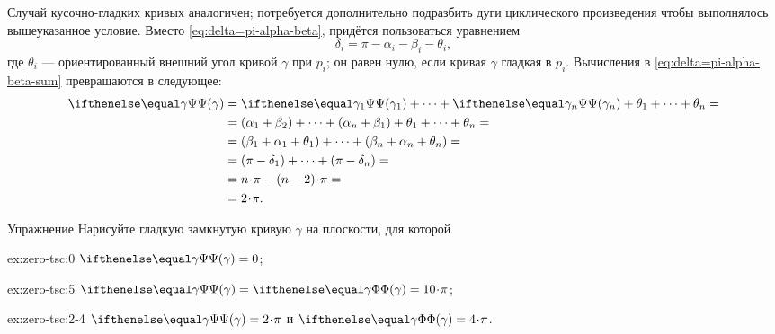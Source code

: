 {\sloppy

Случай кусочно-гладких кривых аналогичен;
потребуется дополнительно подразбить дуги циклического произведения чтобы выполнялось вышеуказанное условие.
Вместо \ref{eq:delta=pi-alpha-beta}, придётся пользоваться уравнением
\[\delta_i=\pi-\alpha_i-\beta_i-\theta_i,\]
где $\theta_i$ --- ориентированный внешний угол кривой $\gamma$ при $p_i$;
он равен нулю, если кривая $\gamma$ гладкая в $p_i$.
Вычисления в \ref{eq:delta=pi-alpha-beta-sum} превращаются в следующее:
\begin{align*}
\tgc\gamma&=\tgc{\gamma_1}+\dots+\tgc{\gamma_n}+\theta_1+\dots+\theta_n=
\\
&=(\alpha_1+\beta_2)+\dots+(\alpha_n+\beta_1)+\theta_1+\dots+\theta_n=
\\
&=(\beta_1+\alpha_1+\theta_1)+\dots+(\beta_n+\alpha_n+\theta_n)=
\\
&=(\pi-\delta_1)+\dots+(\pi-\delta_n)=
\\
&=n\cdot\pi-(n-2)\cdot \pi=
\\
&=2\cdot\pi.
\end{align*}
\qedsf

}

\begin{thm}{Упражнение}\label{ex:zero-tsc}
Нарисуйте гладкую замкнутую кривую $\gamma$ на плоскости, для которой

\begin{subthm}{ex:zero-tsc:0}
$\tgc\gamma=0$;
\end{subthm}
 
\begin{subthm}{ex:zero-tsc:5}
$\tgc\gamma=\tc\gamma=10\cdot\pi$;
\end{subthm}

\begin{subthm}{ex:zero-tsc:2-4}
$\tgc\gamma=2\cdot\pi$ и $\tc\gamma=4\cdot\pi$.
\end{subthm}

\end{thm}

